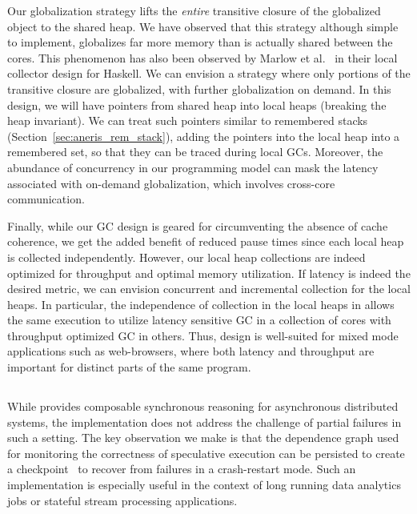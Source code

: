 Our globalization strategy lifts the \emph{entire} transitive closure of the
globalized object to the shared heap. We have observed that this strategy
although simple to implement, globalizes far more memory than is actually
shared between the cores. This phenomenon has also been observed by Marlow et
al.~\cite{Marlow11} in their local collector design for Haskell. We can
envision a strategy where only portions of the transitive closure are
globalized, with further globalization on demand. In this design, we will have
pointers from shared heap into local heaps (breaking the heap invariant). We
can treat such pointers similar to remembered
stacks (Section~\ref{sec:aneris_rem_stack}), adding the pointers into the local heap
into a remembered set, so that they can be traced during local GCs. Moreover,
the abundance of concurrency in our programming model can mask the latency
associated with on-demand globalization, which involves cross-core
communication.

Finally, while our GC design is geared for circumventing the absence of cache
coherence, we get the added benefit of reduced pause times since each local
heap is collected independently. However, our local heap collections are indeed
optimized for throughput and optimal memory utilization. If latency is indeed
the desired metric, we can envision concurrent and incremental collection for
the local heaps. In particular, the independence of collection in the local
heaps in \MMSCC allows the same execution to utilize latency sensitive GC in a
collection of cores with throughput optimized GC in others. Thus, \MMSCC
design is well-suited for mixed mode applications such as web-browsers, where
both latency and throughput are important for distinct parts of the same
program.

\subsection{\rxcml}

While \rxcml provides composable synchronous reasoning for asynchronous
distributed systems, the implementation does not address the challenge of
partial failures in such a setting. The key observation we make is that the
dependence graph used for monitoring the correctness of speculative execution
can be persisted to create a checkpoint~\cite{RollbackRecovery} to recover from
failures in a crash-restart mode. Such an implementation is especially useful
in the context of long running data analytics jobs or stateful stream
processing applications.


